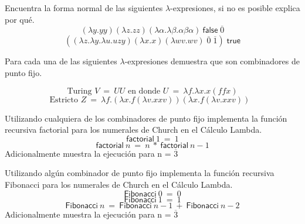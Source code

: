                 \begin{exercise}
                    Encuentra la forma normal de las siguientes $\lambda$-expresiones, si no es posible explica por qué.\\
                    \[
                        (\lambda y.yy)(\lambda z.zz)(\lambda \alpha . \lambda \beta . \alpha \beta \alpha)\ \textsf{false} \; \overline{0}
                    \]
                    \[
                        ((\lambda z. \lambda y. \lambda u.uzy)(\lambda x.x)(\lambda wv.wv) \; \overline{0} \; \overline{1}) \; \textsf{true} 
                    \]
                \end{exercise}


                \begin{exercise}
                    Para cada una de las siguientes $\lambda$-expresiones demuestra que son combinadores de punto fijo.
                    

                        \[\text{Turing $V\ =\ UU$ en donde $U\ =\ \lambda f.\lambda x.x(ffx)$}\]
                        \[\text{Estricto $Z\ =\ \lambda f.(\lambda x.f(\lambda v.xxv))(\lambda x.f(\lambda v.xxv))$ }\]
            
                    
                \end{exercise}



                \begin{exercise}
                    Utilizando cualquiera de los combinadores de punto fijo implementa la función recursiva \textsf{factorial} para los numerales de Church en el Cálculo Lambda.
                    \[ \textsf{factorial}\ 1\ =\ 1 \]
                    \[ \textsf{factorial}\ n\ =\ n\ *\ \textsf{factorial}\ n-1\]
                    Adicionalmente muestra la ejecución para n = $\overline{3}$
                \end{exercise}



                \begin{exercise}
                    Utilizando algún combinador de punto fijo implementa la función recursiva \textsf{Fibonacci} para los numerales de Church en el Cálculo Lambda.
                    \[ \textsf{Fibonacci}\ 0\ =\ 0 \]
                    \[ \textsf{Fibonacci}\ 1\ =\ 1 \]
                    \[ \textsf{Fibonacci}\ n\ =\ \textsf{Fibonacci}\ n-1\ +\ \textsf{Fibonacci}\ n-2\]
                    Adicionalmente muestra la ejecución para n = $\overline{3}$
                \end{exercise}



